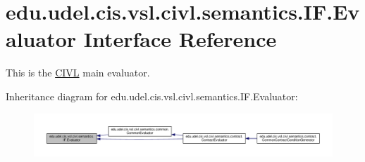 \hypertarget{interfaceedu_1_1udel_1_1cis_1_1vsl_1_1civl_1_1semantics_1_1IF_1_1Evaluator}{}\section{edu.\+udel.\+cis.\+vsl.\+civl.\+semantics.\+I\+F.\+Evaluator Interface Reference}
\label{interfaceedu_1_1udel_1_1cis_1_1vsl_1_1civl_1_1semantics_1_1IF_1_1Evaluator}


This is the \hyperlink{classedu_1_1udel_1_1cis_1_1vsl_1_1civl_1_1CIVL}{C\+I\+V\+L} main evaluator.  




Inheritance diagram for edu.\+udel.\+cis.\+vsl.\+civl.\+semantics.\+I\+F.\+Evaluator\+:
\nopagebreak
\begin{figure}[H]
\begin{center}
\leavevmode
\includegraphics[width=350pt]{interfaceedu_1_1udel_1_1cis_1_1vsl_1_1civl_1_1semantics_1_1IF_1_1Evaluator__inherit__graph}
\end{center}
\end{figure}
